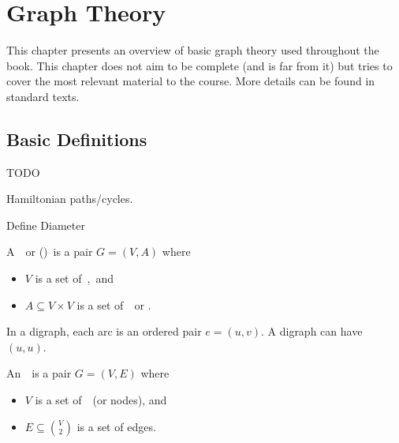 \chapter{Graph Theory}
\label{ch:bg::graphs}

\begin{preamble}
This chapter presents an overview of basic graph theory
used throughout the book.
%
This chapter does not aim to be complete (and is far from it) but
tries to cover the most relevant material to the course.  
%
More details can be found in standard texts.
%
\end{preamble}


\section{Basic Definitions}
\label{sec:bg::graphs::basics}
  
\begin{teachnote}
TODO

Hamiltonian paths/cycles.

Define Diameter
\end{teachnote}

\begin{definition}
A~~or ()~is a pair $G = (V,A)$
where
\begin{itemize}
\item $V$ is a set of~,~and

\item $A \subseteq V \times V$ is a set of~~or .
\end{itemize}
\end{definition}

\begin{note}
In a digraph, each arc is an ordered pair $e = (u,v)$.  A digraph can
have~~$(u,u)$.  
%
\end{note}

\begin{definition}
 An~~is a pair $G = (V,E)$ where
\begin{itemize}
\item  $V$ is a set of~~(or nodes), and
\item  $E \subseteq  \binom{V}{2}$ is a set of edges.
\end{itemize}
\end{definition}

